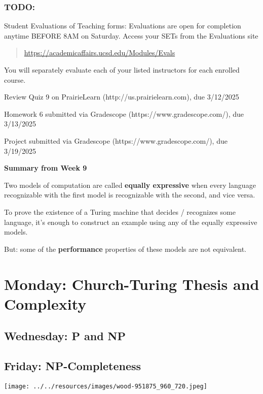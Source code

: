 \vspace{-20pt}

\subsubsection*{TODO:}
\begin{list}{\itemsep-10pt}
   \item Student Evaluations of Teaching forms: Evaluations are open for completion anytime BEFORE 8AM on Saturday.
    Access your SETs from the Evaluations site
    \begin{quote}
         \url{https://academicaffairs.ucsd.edu/Modules/Evals}
    \end{quote}
    You will separately evaluate each of your listed instructors for each enrolled course.
    \item Review Quiz 9 on PrairieLearn (http://us.prairielearn.com), due 3/12/2025
    \item Homework 6 submitted via Gradescope (https://www.gradescope.com/), due 3/13/2025
    \item Project submitted via Gradescope (https://www.gradescope.com/), due 3/19/2025
\end{list}

\newpage


{\bf Summary from Week 9}

Two models of computation are called {\bf equally expressive} when 
every language recognizable with the first model is recognizable with the second, and vice versa.

To prove the existence of a Turing machine that decides / recognizes some language, 
it's enough to construct an example using any of the equally expressive models.

But: some of the {\bf performance} properties of these models are not equivalent.

\section*{Monday: Church-Turing Thesis and Complexity}


    
\newpage
\subsection*{Wednesday: P and NP}




\newpage
\subsection*{Friday: NP-Completeness}


\newpage


\begin{center}
\texttt{[image: ../../resources/images/wood-951875\_960\_720.jpeg]}
\end{center}


